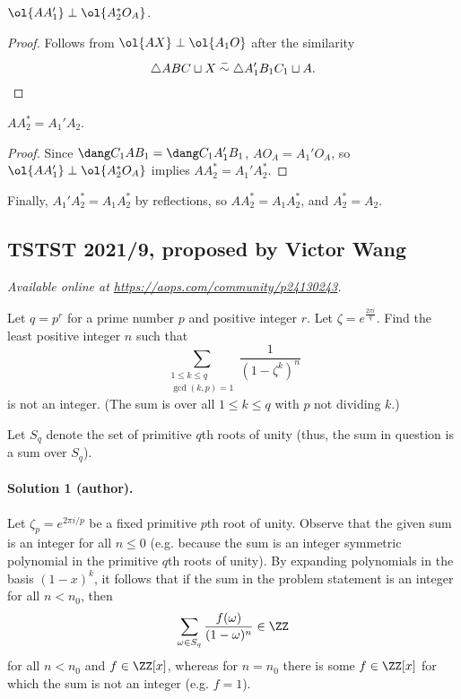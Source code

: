 \documentclass[11pt]{scrartcl}
\begin{document}
\begin{claim*}
  $\ol{AA_1'} \perp \ol{A_2^*O_A}$.
\end{claim*}
\begin{proof}
  Follows from $\ol{AX} \perp \ol{A_1O}$
  after the similarity
  \[ \triangle ABC \sqcup X
  \stackrel{-}{\sim} \triangle A_1'B_1C_1 \sqcup A.\qedhere\]
\end{proof}

\begin{claim*}
  $AA_2^* = A_1'A_2$.
\end{claim*}
\begin{proof}
  Since $\dang C_1AB_1 = \dang C_1A_1'B_1$,
  $AO_A = A_1'O_A$,
  so $\ol{AA_1'} \perp \ol{A_2^*O_A}$
  implies $AA_2^* = A_1'A_2^*$.
\end{proof}

Finally, $A_1'A_2^* = A_1A_2^*$ by reflections,
so $AA_2^* = A_1A_2^*$, and $A_2^* = A_2$.
\pagebreak
\pagebreak

\subsection{TSTST 2021/9, proposed by Victor Wang}
\textsl{Available online at \url{https://aops.com/community/p24130243}.}
\begin{mdframed}[style=mdpurplebox,frametitle={Problem statement}]
Let $q=p^r$ for a prime number $p$ and positive integer $r$.
Let $\zeta = e^{\frac{2\pi i}{q}}$.
Find the least positive integer $n$ such that
\[
  \sum_{\substack{1 \le k \le q \\ \gcd(k,p) = 1}}
  \frac{1}{(1 - \zeta^k)^n}
\]
is not an integer.
(The sum is over all $1\leq k\leq q$ with $p$ not dividing $k$.)
\end{mdframed}
Let $S_q$ denote the set of primitive $q$th roots of unity (thus,
the sum in question is a sum over $S_q$).
\paragraph{Solution 1 (author).}
Let $\zeta_p=e^{2\pi i/p}$ be a fixed primitive $p$th root of unity. Observe
that the given sum is an integer for all $n\leq 0$ (e.g.  because the sum is an
integer symmetric polynomial in the primitive $q$th roots of unity). By
expanding polynomials in the basis $(1-x)^{k}$, it follows that if the sum in
the problem statement is an integer for all $n < n_0$, then
\[\sum_{\omega\in S_q} \frac{f(\omega)}{(1-\omega)^{n}}\in \ZZ\]
for all $n < n_0$ and $f\in \ZZ[x]$, whereas for $n=n_0$ there is some
$f\in \ZZ[x]$ for which the sum is not an integer (e.g. $f=1$).
\end{document}

